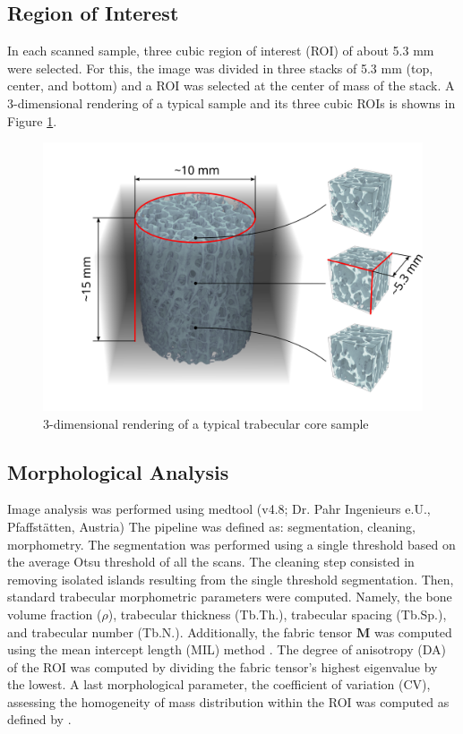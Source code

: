 \documentclass[a4paper,fleqn]{DC_ArtStyle}
\begin{document}
	\subsection{Region of Interest}
	In each scanned sample, three cubic region of interest (ROI) of about 5.3 mm were selected.
	For this, the image was divided in three stacks of 5.3 mm (top, center, and bottom) and a ROI was selected at the center of mass of the stack.
	A 3-dimensional rendering of a typical sample and its three cubic ROIs is showns in Figure \ref{FigSample}.

	\begin{figure}
		\includegraphics[width=\linewidth]{Sample}
		\caption{3-dimensional rendering of a typical trabecular core sample}
		\label{FigSample}
	\end{figure}

	\subsection{Morphological Analysis}
	Image analysis was performed using medtool (v4.8; Dr. Pahr Ingenieurs e.U., Pfaffstätten, Austria)
	The pipeline was defined as: segmentation, cleaning, morphometry.
	The segmentation was performed using a single threshold based on the average Otsu threshold \cite{Otsu1979} of all the scans.
	The cleaning step consisted in removing isolated islands resulting from the single threshold segmentation.
	Then, standard trabecular morphometric parameters were computed.
	Namely, the bone volume fraction ($\rho$), trabecular thickness (Tb.Th.), trabecular spacing (Tb.Sp.), and trabecular number (Tb.N.).
	Additionally, the fabric tensor $\mathbf{M}$ was computed using the mean intercept length (MIL) method \cite{Moreno2014}.
	The degree of anisotropy (DA) of the ROI was computed by dividing the fabric tensor's highest eigenvalue by the lowest.
	A last morphological parameter, the coefficient of variation (CV), assessing the homogeneity of mass distribution within the ROI was computed as defined by \citeauthor{Panyasantisuk2015} \cite{Panyasantisuk2015}.
	
\end{document}
